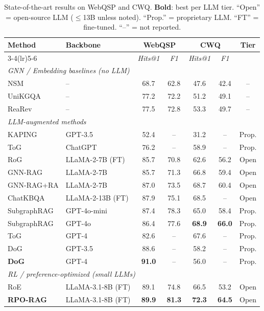 \documentclass[11pt]{article}
\begin{document}
\begin{table}[t]
\centering
\small
\caption{State-of-the-art results on WebQSP and CWQ. \textbf{Bold}: best per LLM tier.
``Open'' = open-source LLM ($\leq$13B unless noted). ``Prop.'' = proprietary LLM.
``FT'' = fine-tuned. ``--'' = not reported.}
\label{tab:sota}
\setlength{\tabcolsep}{5pt}
\begin{tabular}{llccccc}
\toprule
\multirow{2}{*}{\textbf{Method}} & \multirow{2}{*}{\textbf{Backbone}} &
\multicolumn{2}{c}{\textbf{WebQSP}} & \multicolumn{2}{c}{\textbf{CWQ}} &
\multirow{2}{*}{\textbf{Tier}} \\
\cmidrule(lr){3-4}\cmidrule(lr){5-6}
& & \textit{Hits@1} & \textit{F1} & \textit{Hits@1} & \textit{F1} & \\
\midrule
\multicolumn{7}{l}{\textit{GNN / Embedding baselines (no LLM)}} \\
NSM          & --                    & 68.7 & 62.8 & 47.6 & 42.4 & -- \\
UniKGQA      & --                    & 77.2 & 72.2 & 51.2 & 49.1 & -- \\
ReaRev       & --                    & 77.5 & 72.8 & 53.3 & 49.7 & -- \\
\midrule
\multicolumn{7}{l}{\textit{LLM-augmented methods}} \\
KAPING       & GPT-3.5               & 52.4 & --   & 31.2 & --   & Prop. \\
ToG          & ChatGPT               & 76.2 & --   & 58.9 & --   & Prop. \\
RoG          & LLaMA-2-7B (FT)       & 85.7 & 70.8 & 62.6 & 56.2 & Open \\
GNN-RAG      & LLaMA-2-7B            & 85.7 & 71.3 & 66.8 & 59.4 & Open \\
GNN-RAG+RA   & LLaMA-2-7B            & 87.0 & 73.5 & 68.7 & 60.4 & Open \\
ChatKBQA     & LLaMA-2-13B (FT)      & 87.9 & 75.1 & 68.5 & --   & Open \\
SubgraphRAG  & GPT-4o-mini           & 87.4 & 78.3 & 65.0 & 58.4 & Prop. \\
SubgraphRAG  & GPT-4o                & 86.4 & 77.6 & \textbf{68.9} & \textbf{66.0} & Prop. \\
ToG          & GPT-4                 & 82.6 & --   & 67.6 & --   & Prop. \\
DoG          & GPT-3.5               & 88.6 & --   & 58.2 & --   & Prop. \\
\textbf{DoG} & GPT-4                 & \textbf{91.0} & -- & 56.0 & -- & Prop. \\
\midrule
\multicolumn{7}{l}{\textit{RL / preference-optimized (small LLMs)}} \\
RoE          & LLaMA-3.1-8B (FT)     & 89.1 & 74.8 & 66.5 & 53.2 & Open \\
\textbf{RPO-RAG} & LLaMA-3.1-8B (FT) & \textbf{89.9} & \textbf{81.3} & \textbf{72.3} & \textbf{64.5} & Open \\
\bottomrule
\end{tabular}
\end{table}
\end{document}
